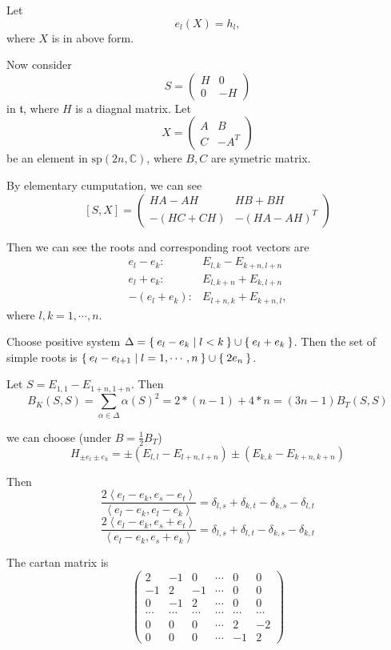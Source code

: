 \documentclass[12pt]{amsart}
\def\bC{{\mathbb{C}}}
\def\inn#1#2{\left\langle{#1},{#2}\right\rangle}
\def\asp{\mathrm{sp}}
\def\ft{\mathfrak{t}}
\begin{document}
Let 
\[
e_l(X) = h_l,
\]
where $X$ is in above form.

Now consider 
\[ S = 
 \begin{pmatrix}
  H & 0 \\
  0 & -H
\end{pmatrix}
\]
in $\ft$, where $H$ is a diagnal matrix.
Let 
\[
X = \begin{pmatrix}
  A & B \\
  C & -A^T
\end{pmatrix}
\] be an element in $\asp(2n,\bC)$, where $B, C$ are symetric matrix. 

By elementary cumputation, we can see
\[
[S, X] = 
\begin{pmatrix}
  HA-AH & HB + BH \\
  -(HC+CH) & -(HA-AH)^T 
\end{pmatrix}
\]

Then we can see the roots and corresponding root vectors are
\begin{align*}
e_l-e_k : & E_{l,k} -E_{k+n,l+n} \\
e_l+e_k : & E_{l, k+n} + E_{k,l+n} \\
-(e_l+e_k) :& E_{l+n,k} + E_{k+n,l} ,
\end{align*}
where $l,k = 1, \cdots, n$.

Choose positive system $\Delta=\Set{e_l-e_k|l<k} \cup \Set{e_l+e_k}$.
Then the set of simple roots is $\Set{e_l-e_{l+1}|l=1,\cdots, n} \cup \Set{2e_{n}}$.

Let $S = E_{1,1} - E_{1+n,1+n}$.
Then 
\[
B_K(S,S) = \sum_{\alpha\in \Delta} \alpha(S)^2 = 2*(n-1) + 4*n = (3n-1) B_T(S,S)
\]

we can choose (under $B = \frac{1}{2}B_T$)
\[
H_{\pm e_l \pm e_k} = \pm(E_{l,l}-E_{l+n,l+n}) \pm (E_{k,k}-E_{k+n,k+n})
\]

Then 
\[
\frac{2\inn{e_l-e_k}{e_s-e_t}}{\inn{e_l-e_k}{e_l-e_k}}
=\delta_{l,s} + \delta_{k,t}-\delta_{k,s} -\delta_{l,t}
\]
\[
\frac{2\inn{e_l-e_k}{e_s+e_t}}{\inn{e_l-e_k}{e_s+e_k}}
=\delta_{l,s} + \delta_{l,t}-\delta_{k,s} -\delta_{k,t}
\]

The cartan matrix is 
\[
\begin{pmatrix}
 2 & -1 &  0 & \cdots & 0 & 0 \\
-1 &  2 & -1 & \cdots & 0 & 0 \\
0  & -1 &  2 & \cdots & 0 & 0 \\
\cdots & \cdots &\cdots & \cdots &\cdots & \cdots \\
0  & 0  &  0 & \cdots & 2 & -2 \\
0  & 0  &  0 & \cdots & -1 & 2 
\end{pmatrix}
\]
\end{document}
